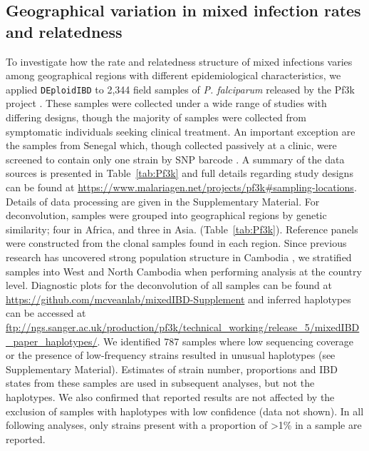\documentclass[9pt,lineno]{elife}
\begin{document}
\subsection{Geographical variation in mixed infection rates and relatedness}

To investigate how the rate and relatedness structure of mixed infections varies among geographical regions with different epidemiological characteristics, we applied \texttt{DEploidIBD} to 2,344 field samples of {\it P. falciparum} released by the Pf3k project \citep{pf3k}.  These samples were collected under a wide range of studies with differing designs, though the majority of samples were collected from symptomatic individuals seeking clinical treatment. An important exception are the samples from Senegal which, though collected passively at a clinic, were screened to contain only one strain by SNP barcode \citep{Daniels2015}.  A summary of the data sources is presented in Table~\ref{tab:Pf3k} and full details regarding study designs can be found at \url{https://www.malariagen.net/projects/pf3k#sampling-locations}. Details of data processing are given in the Supplementary Material. For deconvolution, samples were grouped into geographical regions by genetic similarity; four in Africa, and three in Asia. (Table~\ref{tab:Pf3k}). Reference panels were constructed from the clonal samples found in each region. Since previous research has uncovered strong population structure in Cambodia \citep{Miotto2013}, we stratified samples into West and North Cambodia when performing analysis at the country level. Diagnostic plots for the deconvolution of all samples can be found at \url{https://github.com/mcveanlab/mixedIBD-Supplement} and inferred haplotypes can be accessed at \url{ftp://ngs.sanger.ac.uk/production/pf3k/technical_working/release_5/mixedIBD_paper_haplotypes/}. We identified 787 samples where low sequencing coverage or the presence of low-frequency strains resulted in unusual haplotypes (see Supplementary Material). Estimates of strain number, proportions and IBD states from these samples are used in subsequent analyses, but not the haplotypes. We also confirmed that reported results are not affected by the exclusion of samples with haplotypes with low confidence (data not shown).  In all following analyses, only strains present with a proportion of >1\% in a sample are reported.
\end{document}
